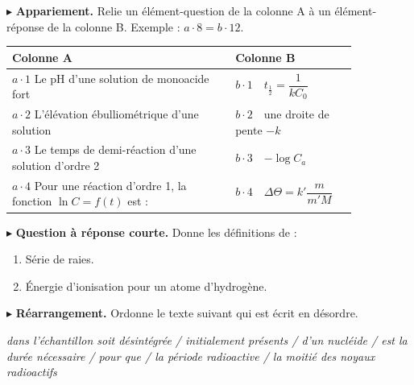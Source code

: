 \documentclass[11pt]{article}
\begin{document}



\noindent$\blacktriangleright$ \textbf{Appariement.} Relie un élément-question de la colonne A à un élément-réponse de la colonne B. Exemple : $a\cdot8 = b\cdot12$.

\begin{center}\renewcommand{\arraystretch}{1.6}
\begin{tabular}{|p{0.55\linewidth}|p{0.3\linewidth}|}
\hline
\textbf{Colonne A} & \textbf{Colonne B} \\
\hline
$a\cdot1$ Le pH d'une solution de monoacide fort & $b\cdot1$\ \ $t_{\frac{1}{2}} = \dfrac{1}{kC_0}$ \\
\hline
$a\cdot2$ L'élévation ébulliométrique d'une solution & $b\cdot2$\ \ une droite de pente $-k$ \\
\hline
$a\cdot3$ Le temps de demi-réaction d'une solution d'ordre 2 & $b\cdot3$\ \ $-\log C_a$ \\
\hline
$a\cdot4$ Pour une réaction d'ordre 1, la fonction $\ln C = f(t)$ est : & $b\cdot4$\ \ $\Delta\Theta = k'\dfrac{m}{m'M}$ \\
\hline
\end{tabular}
\end{center}

\noindent$\blacktriangleright$ \textbf{Question à réponse courte.} Donne les définitions de :
\begin{enumerate}[label=\alph*.]
  \item Série de raies.
  \item Énergie d'ionisation pour un atome d'hydrogène.
\end{enumerate}

\medskip
\noindent$\blacktriangleright$ \textbf{Réarrangement.} Ordonne le texte suivant qui est écrit en désordre.

\textit{dans l'échantillon soit désintégrée / initialement présents / d'un nucléide / est la durée nécessaire / pour que / la période radioactive / la moitié des noyaux radioactifs}
\end{document}
